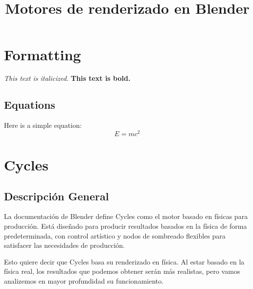 \documentclass{article}
\title{Motores de renderizado en Blender}
\begin{document}
\maketitle

\section{Formatting}
\textit{This text is italicized.}
\textbf{This text is bold.}

\subsection{Equations}
Here is a simple equation:
\[E=mc^2\]

\section{Cycles}
\subsection{Descripción General}
La documentación de Blender define Cycles como el motor basado en físicas para producción. 
Está diseñado para producir resultados basados en la física de forma predeterminada, 
con control artístico y nodos de sombreado flexibles para satisfacer las necesidades 
de producción.

Esto quiere decir que Cycles basa su renderizado en física. Al estar basado en la
física real, los resultados que podemos obtener serán más realistas, pero vamos analizemos
en mayor profundidad su funcionamiento.
\end{document}
